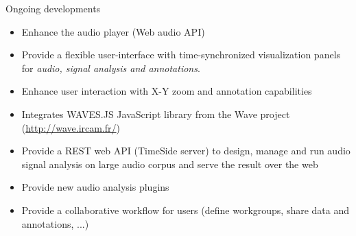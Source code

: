 \documentclass[final, hyperref, table]{beamer}
\begin{document}
\begin{frame}[containsverbatim]{}
\begin{columns}[T]
\begin{column}[T]{.5\linewidth}

  \begin{block}{Ongoing developments}
\vspace{-1cm}
    \begin{multicols}{2}[]
        \begin{itemize}
        \item Enhance the audio player (Web audio API) 
        \item Provide a flexible user-interface with time-synchronized \alert{visualization} panels for \emph{audio, signal analysis and annotations}.
         \item Enhance user interaction with \alert{X-Y zoom} and \alert{annotation} capabilities
          \item Integrates WAVES.JS JavaScript library from the Wave project (\url{http://wave.ircam.fr/})
        \item Provide a REST web API (TimeSide server) to design, manage and run audio signal analysis on large audio corpus and serve the result over the web
        \item Provide new audio analysis plugins
          \item Provide a collaborative workflow for users (define workgroups, share data and annotations, ...)


\end{itemize}
\end{multicols}
\end{block}
\end{column}
\end{columns}
\end{frame}
\end{document}
